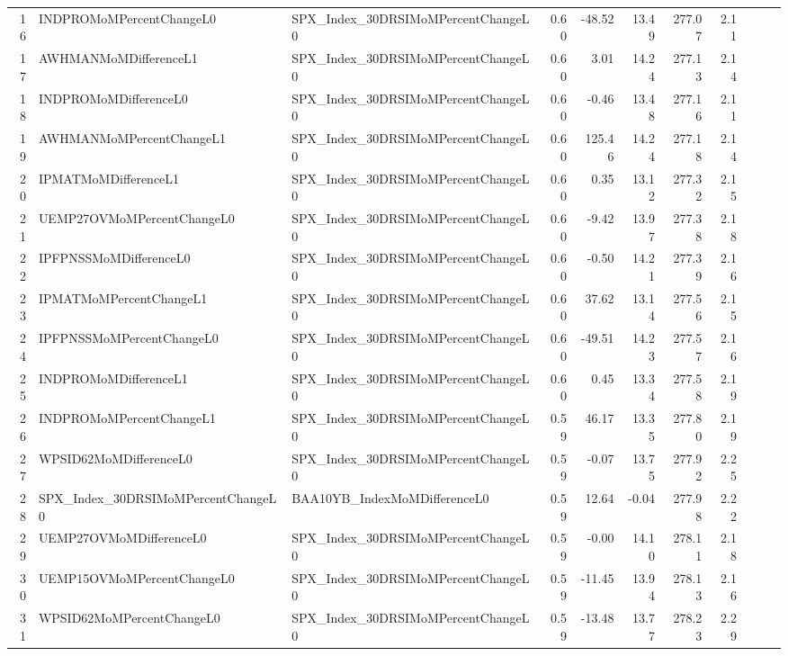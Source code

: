 \begin{longtable}{rllrrrrrlll}
  16 & INDPROMoMPercentChangeL0 & SPX\_Index\_30DRSIMoMPercentChangeL0 & 0.60 & -48.52 & 13.49 & 277.07 & 2.11 &  &  &  \\ 
  17 & AWHMANMoMDifferenceL1 & SPX\_Index\_30DRSIMoMPercentChangeL0 & 0.60 & 3.01 & 14.24 & 277.13 & 2.14 &  &  &  \\ 
  18 & INDPROMoMDifferenceL0 & SPX\_Index\_30DRSIMoMPercentChangeL0 & 0.60 & -0.46 & 13.48 & 277.16 & 2.11 &  &  &  \\ 
  19 & AWHMANMoMPercentChangeL1 & SPX\_Index\_30DRSIMoMPercentChangeL0 & 0.60 & 125.46 & 14.24 & 277.18 & 2.14 &  &  &  \\ 
  20 & IPMATMoMDifferenceL1 & SPX\_Index\_30DRSIMoMPercentChangeL0 & 0.60 & 0.35 & 13.12 & 277.32 & 2.15 &  &  &  \\ 
  21 & UEMP27OVMoMPercentChangeL0 & SPX\_Index\_30DRSIMoMPercentChangeL0 & 0.60 & -9.42 & 13.97 & 277.38 & 2.18 &  &  &  \\ 
  22 & IPFPNSSMoMDifferenceL0 & SPX\_Index\_30DRSIMoMPercentChangeL0 & 0.60 & -0.50 & 14.21 & 277.39 & 2.16 &  &  &  \\ 
  23 & IPMATMoMPercentChangeL1 & SPX\_Index\_30DRSIMoMPercentChangeL0 & 0.60 & 37.62 & 13.14 & 277.56 & 2.15 &  &  &  \\ 
  24 & IPFPNSSMoMPercentChangeL0 & SPX\_Index\_30DRSIMoMPercentChangeL0 & 0.60 & -49.51 & 14.23 & 277.57 & 2.16 &  &  &  \\ 
  25 & INDPROMoMDifferenceL1 & SPX\_Index\_30DRSIMoMPercentChangeL0 & 0.60 & 0.45 & 13.34 & 277.58 & 2.19 &  &  &  \\ 
  26 & INDPROMoMPercentChangeL1 & SPX\_Index\_30DRSIMoMPercentChangeL0 & 0.59 & 46.17 & 13.35 & 277.80 & 2.19 &  &  &  \\ 
  27 & WPSID62MoMDifferenceL0 & SPX\_Index\_30DRSIMoMPercentChangeL0 & 0.59 & -0.07 & 13.75 & 277.92 & 2.25 &  &  &  \\ 
  28 & SPX\_Index\_30DRSIMoMPercentChangeL0 & BAA10YB\_IndexMoMDifferenceL0 & 0.59 & 12.64 & -0.04 & 277.98 & 2.22 &  &  &  \\ 
  29 & UEMP27OVMoMDifferenceL0 & SPX\_Index\_30DRSIMoMPercentChangeL0 & 0.59 & -0.00 & 14.10 & 278.11 & 2.18 &  &  &  \\ 
  30 & UEMP15OVMoMPercentChangeL0 & SPX\_Index\_30DRSIMoMPercentChangeL0 & 0.59 & -11.45 & 13.94 & 278.13 & 2.16 &  &  &  \\ 
  31 & WPSID62MoMPercentChangeL0 & SPX\_Index\_30DRSIMoMPercentChangeL0 & 0.59 & -13.48 & 13.77 & 278.23 & 2.29 &  &  &  \\ 

\end{longtable}
